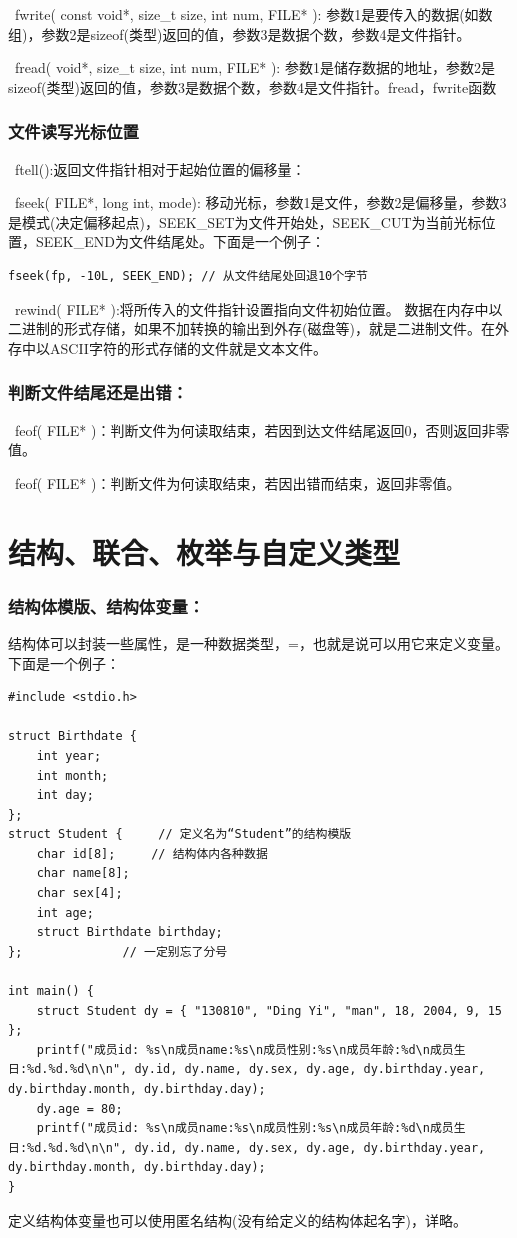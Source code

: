 \documentclass[zihao=-4,UTF8]{report}
\begin{document}
\ fwrite( const void*, size\_t size, int num, FILE* ): 参数1是要传入的数据(如数组)，参数2是sizeof(类型)返回的值，参数3是数据个数，参数4是文件指针。\par
{}\ fread( void*, size\_t size, int num, FILE* ): 参数1是储存数据的地址，参数2是sizeof(类型)返回的值，参数3是数据个数，参数4是文件指针。{\color{gray}\small fread，fwrite函数}\par
\subsubsection{文件读写光标位置}
\ ftell():返回文件指针相对于起始位置的偏移量：\par
{}\ fseek( FILE*, long int, mode): 移动光标，参数1是文件，参数2是偏移量，参数3是模式(决定偏移起点)，SEEK\_SET为文件开始处，SEEK\_CUT为当前光标位置，SEEK\_END为文件结尾处。下面是一个例子：
\begin{lstlisting}
fseek(fp, -10L, SEEK_END); // 从文件结尾处回退10个字节
\end{lstlisting}
\par
{}\ rewind( FILE* ):将所传入的文件指针设置指向文件初始位置。
{\color{gray}\small 数据在内存中以二进制的形式存储，如果不加转换的输出到外存(磁盘等)，就是二进制文件。在外存中以ASCII字符的形式存储的文件就是文本文件。}
\subsubsection{判断文件结尾还是出错：}
\ feof( FILE* )：判断文件为何读取结束，若因到达文件结尾返回0，否则返回非零值。\par
{}\ feof( FILE* )：判断文件为何读取结束，若因出错而结束，返回非零值。

\section{结构、联合、枚举与自定义类型}
\subsubsection{结构体模版、结构体变量：}
结构体可以封装一些属性，是一种数据类型，=，也就是说可以用它来定义变量。下面是一个例子：
\begin{lstlisting}
#include <stdio.h>

struct Birthdate {
    int year;
    int month;
    int day;
};
struct Student {     // 定义名为“Student”的结构模版
    char id[8];     // 结构体内各种数据
    char name[8];
    char sex[4];
    int age;
    struct Birthdate birthday;
};              // 一定别忘了分号

int main() {
    struct Student dy = { "130810", "Ding Yi", "man", 18, 2004, 9, 15 };
    printf("成员id: %s\n成员name:%s\n成员性别:%s\n成员年龄:%d\n成员生日:%d.%d.%d\n\n", dy.id, dy.name, dy.sex, dy.age, dy.birthday.year, dy.birthday.month, dy.birthday.day);
    dy.age = 80;
    printf("成员id: %s\n成员name:%s\n成员性别:%s\n成员年龄:%d\n成员生日:%d.%d.%d\n\n", dy.id, dy.name, dy.sex, dy.age, dy.birthday.year, dy.birthday.month, dy.birthday.day);
}
\end{lstlisting}
{\color{gray}\small 定义结构体变量也可以使用匿名结构(没有给定义的结构体起名字)，详略。}
\end{document}
